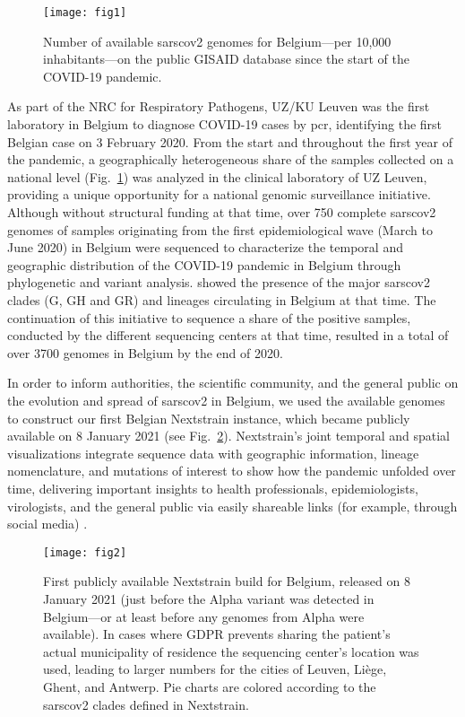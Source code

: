 \begin{figure}[ht]
  \centering
  \texttt{[image: fig1]}
  \caption[Total SARS-CoV-2 genomes in Belgium]{Number of available \gls{sarscov2} genomes for Belgium---per 10,000 inhabitants---on the public GISAID database since the start of the COVID-19 pandemic.}
  \label{fig:beGenomesPer10k}
\end{figure}

As part of the NRC for Respiratory Pathogens, UZ/KU Leuven was the first laboratory in Belgium to diagnose COVID-19 cases by \gls{pcr}, identifying the first Belgian case on 3 February 2020.
From the start and throughout the first year of the pandemic, a geographically heterogeneous share of the samples collected on a national level (Fig.~\ref{fig:beGenomesPer10k}) was analyzed in the clinical laboratory of UZ Leuven, providing a unique opportunity for a national genomic surveillance initiative.
Although without structural funding at that time, over 750 complete \gls{sarscov2} genomes of samples originating from the first epidemiological wave (March to June 2020) in Belgium were sequenced to characterize the temporal and geographic distribution of the COVID-19 pandemic in Belgium through phylogenetic and variant analysis.
\citet{wawina-bokalanga2021genetic} showed the presence of the major \gls{sarscov2} clades (G, GH and GR) and lineages circulating in Belgium at that time.
The continuation of this initiative to sequence a share of the positive samples, conducted by the different sequencing centers at that time, resulted in a total of over 3700 genomes in Belgium by the end of 2020.

In order to inform authorities, the scientific community, and the general public on the evolution and spread of \gls{sarscov2} in Belgium, we used the available genomes to construct our first Belgian Nextstrain instance, which became publicly available on 8 January 2021 (see Fig.~\ref{fig:beFirstMap}).
Nextstrain's joint temporal and spatial visualizations integrate sequence data with geographic information, lineage nomenclature, and mutations of interest to show how the pandemic unfolded over time, delivering important insights to health professionals, epidemiologists, virologists, and the general public via easily shareable links (for example, through social media) \citep{hadfield2018nextstrain}.

\begin{figure}[ht]
  \centering
  \texttt{[image: fig2]}
  \caption[First Belgian Nextstrain map]{First publicly available Nextstrain build for Belgium, released on 8 January 2021 (just before the Alpha variant was detected in Belgium—or at least before any genomes from Alpha were available). In cases where GDPR prevents sharing the patient's actual municipality of residence the sequencing center's location was used, leading to larger numbers for the cities of Leuven, Li\`{e}ge, Ghent, and Antwerp. Pie charts are colored according to the \gls{sarscov2} clades defined in Nextstrain.}
  \label{fig:beFirstMap}
\end{figure} 

